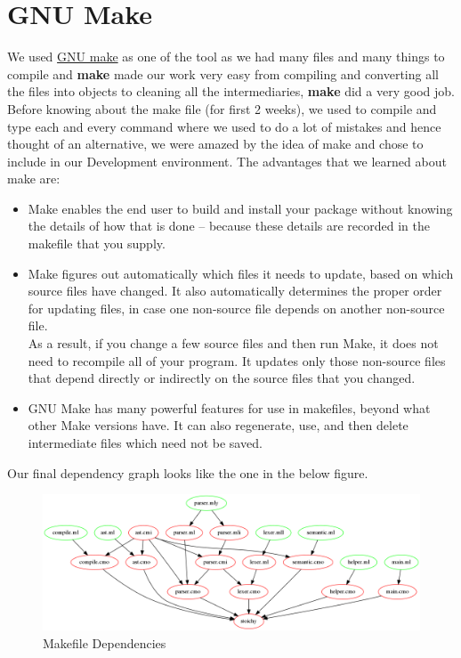 \documentclass[english,a4paper,12pt]{report}
\begin{document}
\section{GNU Make}
  We used \href{https://www.gnu.org/software/make/}{GNU make} as one of the tool as we had many files and many things to compile and \textbf{make} made our work very easy from compiling and converting all the files into objects to cleaning all the intermediaries, \textbf{make} did a very good job. Before knowing about the make file (for first 2 weeks), we used to compile and type each and every command where we used to do a lot of mistakes and hence thought of an alternative, we were amazed by the idea of make and chose to include in our Development environment. The advantages that we learned about make are:
  \begin{itemize}
      \item Make enables the end user to build and install your package without knowing the details of how that is done -- because these details are recorded in the makefile that you supply.
      \item Make figures out automatically which files it needs to update, based on which source files have changed. It also automatically determines the proper order for updating files, in case one non-source file depends on another non-source file.\\ 
      As a result, if you change a few source files and then run Make, it does not need to recompile all of your program. It updates only those non-source files that depend directly or indirectly on the source files that you changed.
      \item GNU Make has many powerful features for use in makefiles, beyond what other Make versions have. It can also regenerate, use, and then delete intermediate files which need not be saved.
  \end{itemize}
  Our final dependency graph looks like the one in the below figure.
 \begin{figure}[H]
 \includegraphics[width=\linewidth,height=\textheight,keepaspectratio]{./pictures/my_graph.png}
 \caption{Makefile Dependencies}
\end{figure}
\end{document}
